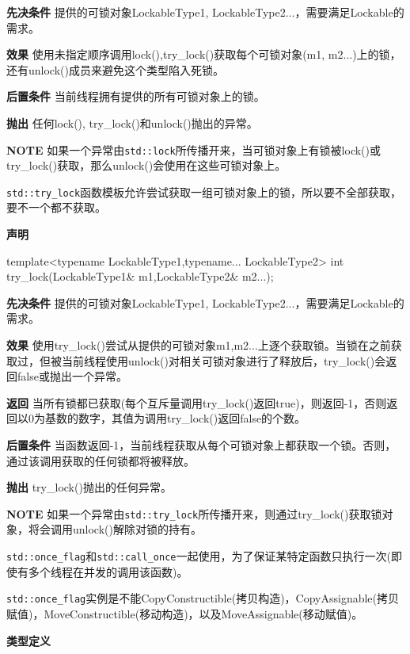 \textbf{先决条件}
提供的可锁对象LockableType1, LockableType2...，需要满足Lockable的需求。

\textbf{效果}
使用未指定顺序调用lock(),try\_lock()获取每个可锁对象(m1, m2...)上的锁，还有unlock()成员来避免这个类型陷入死锁。

\textbf{后置条件}
当前线程拥有提供的所有可锁对象上的锁。

\textbf{抛出}
任何lock(), try\_lock()和unlock()抛出的异常。

\textbf{NOTE} 如果一个异常由\texttt{std::lock}所传播开来，当可锁对象上有锁被lock()或try\_lock()获取，那么unlock()会使用在这些可锁对象上。


\texttt{std::try\_lock}函数模板允许尝试获取一组可锁对象上的锁，所以要不全部获取，要不一个都不获取。

\textbf{声明}

\begin{cpp}
template<typename LockableType1,typename... LockableType2>
int try_lock(LockableType1& m1,LockableType2& m2...);
\end{cpp}

\textbf{先决条件}
提供的可锁对象LockableType1, LockableType2...，需要满足Lockable的需求。

\textbf{效果}
使用try\_lock()尝试从提供的可锁对象m1,m2...上逐个获取锁。当锁在之前获取过，但被当前线程使用unlock()对相关可锁对象进行了释放后，try\_lock()会返回false或抛出一个异常。

\textbf{返回}
当所有锁都已获取(每个互斥量调用try\_lock()返回true)，则返回-1，否则返回以0为基数的数字，其值为调用try\_lock()返回false的个数。

\textbf{后置条件}
当函数返回-1，当前线程获取从每个可锁对象上都获取一个锁。否则，通过该调用获取的任何锁都将被释放。

\textbf{抛出}
try\_lock()抛出的任何异常。

\textbf{NOTE} 如果一个异常由\texttt{std::try\_lock}所传播开来，则通过try\_lock()获取锁对象，将会调用unlock()解除对锁的持有。


\texttt{std::once\_flag}和\texttt{std::call\_once}一起使用，为了保证某特定函数只执行一次(即使有多个线程在并发的调用该函数)。

\texttt{std::once\_flag}实例是不能CopyConstructible(拷贝构造)，CopyAssignable(拷贝赋值)，MoveConstructible(移动构造)，以及MoveAssignable(移动赋值)。

\textbf{类型定义}

